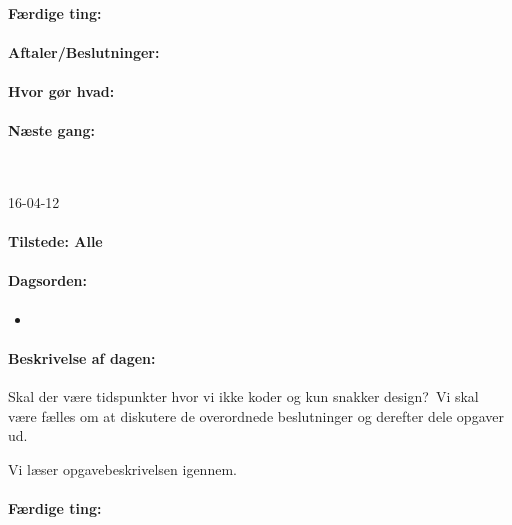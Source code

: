 \documentclass[a4paper,10pt,titlepage]{article}
\begin{document}
		\paragraph{F\ae rdige ting:}
		
		\paragraph{Aftaler/Beslutninger:}
		
		\paragraph{Hvor g\o r hvad:}
		
		\paragraph{N\ae ste gang:}\mbox{}\\
		
		\begin{center}
		16-04-12
		\end{center}
		
		\paragraph{Tilstede: Alle}
		\paragraph{Dagsorden:}
		\begin{itemize}
					\item 
					
		\end{itemize}
		
		\paragraph{Beskrivelse af dagen:}
		Skal der v\ae re tidspunkter hvor vi ikke koder og kun snakker design?\
Vi skal v\ae re f\ae lles om at diskutere de overordnede beslutninger og derefter dele opgaver ud.\

Vi l\ae ser opgavebeskrivelsen igennem.

		\paragraph{F\ae rdige ting:}
		
\end{document}
